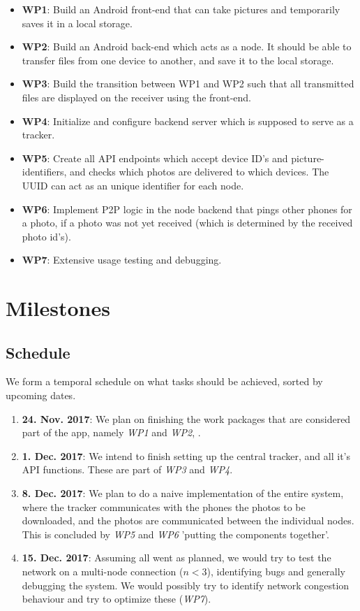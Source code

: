 \documentclass{report}
\begin{document}
\begin{itemize}
        \item {\bf WP1}:  Build an Android front-end that can take pictures and temporarily saves it in a local storage.    
        \item {\bf WP2}:  Build an Android back-end which acts as a node. 
        It should be able to transfer files from one device to another, and save it to the local storage.
        \item {\bf WP3}: Build the transition between WP1 and WP2 such that all transmitted files are displayed on the receiver using the front-end.    
        \item {\bf WP4}: Initialize and configure backend server which is supposed to serve as a tracker.    
        \item {\bf WP5}: Create all API endpoints which accept device ID's and picture-identifiers, and checks which photos are delivered to which devices. 
        The UUID can act as an unique identifier for each node.    
        \item {\bf WP6}: Implement P2P logic in the node backend that pings other phones for a photo, if a photo was not yet received (which is determined by the received photo id's). 
        \item {\bf WP7}: Extensive usage testing and debugging.
\end{itemize}
 
\section{Milestones}


\subsection{Schedule}
We form a temporal schedule on what tasks should be achieved, sorted by upcoming dates.
\begin{enumerate}
\item  \textbf{24. Nov. 2017}: We plan on finishing the work packages that are considered part of the app, namely \textit{WP1} and \textit{WP2}, .
\item  \textbf{1. Dec. 2017}: We intend to finish setting up the central tracker, and all it's API functions. These are part of \textit{WP3} and \textit{WP4}.
\item \textbf{8. Dec. 2017}: We plan to do a naive implementation of the entire system, where the tracker communicates with the phones the photos to be downloaded, and the photos are communicated between the individual nodes. This is concluded by \textit{WP5} and  \textit{WP6} 'putting the components together'.
\item \textbf{15. Dec. 2017}: Assuming all went as planned, we would try to test the network on a multi-node connection ($n < 3$), identifying bugs and generally debugging the system. 
We would possibly try to identify network congestion behaviour and try to optimize these (\textit{WP7}).
\end{enumerate}
\end{document}

